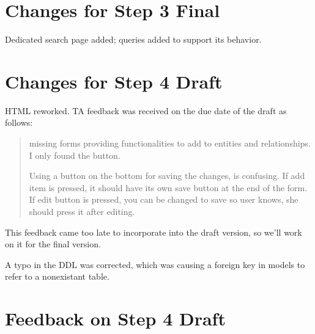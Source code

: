 \documentclass[11pt,letterpaper,oneside]{amsart}
\begin{document}
\section{Changes for Step 3 Final}

Dedicated search page added; queries added to support its behavior.

\section{Changes for Step 4 Draft}

HTML reworked.  TA feedback was received on the due date of the draft as follows:

\begin{quotation}
missing forms providing functionalities to add to entities and relationships. I only found the button.

Using a button on the bottom for saving the changes, is confusing.  If add item is pressed, it should have its own save button at the end of the form. If edit button is pressed, you can be changed to save so user knows, she should press it after editing.

\end{quotation}

This feedback came too late to incorporate into the draft version, so we'll work on it for the final version.

A typo in the DDL was corrected, which was causing a foreign key in models to refer to a nonexistant table.

\section{Feedback on Step 4 Draft}
\end{document}
